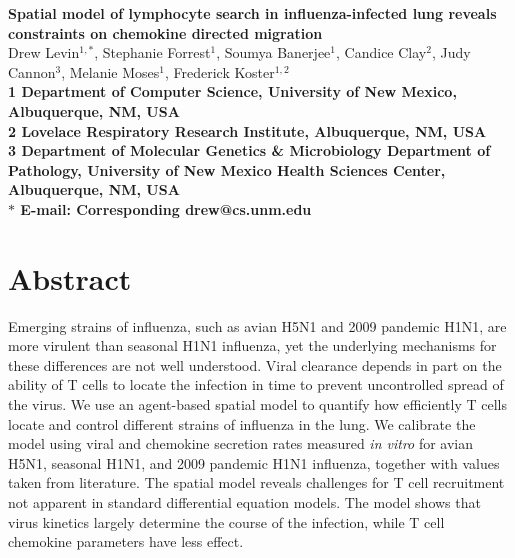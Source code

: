 \documentclass[10pt]{article}
\date{}
\begin{document}
\begin{flushleft}
{\Large
\textbf{Spatial model of lymphocyte search in influenza-infected lung reveals constraints on chemokine directed migration}
}
\\
Drew Levin$^{1,\ast}$, 
Stephanie Forrest$^{1}$, 
Soumya Banerjee$^{1}$,
Candice Clay$^{2}$, 
Judy Cannon$^{3}$,
Melanie Moses$^{1}$, 
Frederick Koster$^{1,2}$
\\
\bf{1} Department of Computer Science, University of New Mexico, Albuquerque, NM, USA
\\
\bf{2} Lovelace Respiratory Research Institute, Albuquerque, NM, USA
\\
\bf{3} Department of Molecular Genetics \& Microbiology Department of Pathology, University of New Mexico Health Sciences Center, Albuquerque, NM, USA
\\
$\ast$ E-mail: Corresponding drew@cs.unm.edu
\end{flushleft}



\section*{Abstract}

Emerging strains of influenza, such as avian H5N1 and 2009 pandemic H1N1, are more virulent than seasonal H1N1 influenza, yet the underlying mechanisms for these differences are not well understood.  Viral clearance depends in part on the ability of T cells to locate the infection in time to prevent uncontrolled spread of the virus.  We use an agent-based spatial model to quantify how efficiently T cells locate and control different strains of influenza in the lung.  We calibrate the model using viral and chemokine secretion rates measured \textit{in vitro} for avian H5N1, seasonal H1N1, and 2009 pandemic H1N1 influenza, together with values taken from literature.  The spatial model reveals challenges for T cell recruitment not apparent in standard differential equation models.  The model shows that virus kinetics largely determine the course of the infection, while T cell chemokine parameters have less effect.


\end{document}
